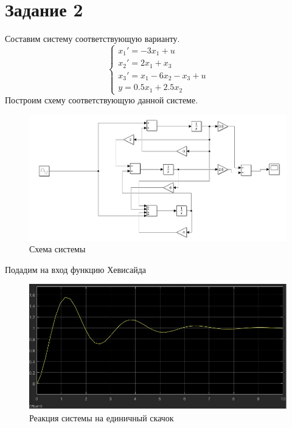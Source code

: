 \documentclass[a4paper, 12pt]{article}
\begin{document}
        \section{Задание 2}
        Составим систему соответствующую варианту.
        $$\begin{cases}
            x_1' = -3x_1 + u\\
            x_2' = 2x_1 + x_3\\
            x_3' = x_1 -6x_2 - x_3 + u\\
            y = 0.5x_1+ 2.5x_2
         \end{cases}$$
         Построим схему соответствующую данной системе.
         \begin{figure}[H]
            \centering
            \includegraphics[scale=0.4]{2.0.png}
            \captionsetup{skip=0pt}
            \caption{Схема системы}
            \label{fig:5imspdf}
        \end{figure}
        Подадим на вход функцию Хевисайда
        \begin{figure}[H]
            \centering
            \includegraphics[scale=0.4]{2.1.jpg}
            \captionsetup{skip=0pt}
            \caption{Реакция системы на единичный скачок}
            \label{fig:5imspdf}
        \end{figure}
\end{document}
